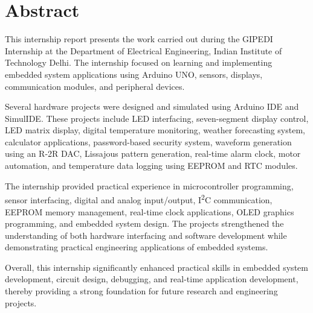 \chapter*{Abstract}

This internship report presents the work carried out during the GIPEDI Internship at the Department of Electrical Engineering, Indian Institute of Technology Delhi. The internship focused on learning and implementing embedded system applications using Arduino UNO, sensors, displays, communication modules, and peripheral devices.

Several hardware projects were designed and simulated using Arduino IDE and SimulIDE. These projects include LED interfacing, seven-segment display control, LED matrix display, digital temperature monitoring, weather forecasting system, calculator applications, password-based security system, waveform generation using an R-2R DAC, Lissajous pattern generation, real-time alarm clock, motor automation, and temperature data logging using EEPROM and RTC modules.

The internship provided practical experience in microcontroller programming, sensor interfacing, digital and analog input/output, I\textsuperscript{2}C communication, EEPROM memory management, real-time clock applications, OLED graphics programming, and embedded system design. The projects strengthened the understanding of both hardware interfacing and software development while demonstrating practical engineering applications of embedded systems.

Overall, this internship significantly enhanced practical skills in embedded system development, circuit design, debugging, and real-time application development, thereby providing a strong foundation for future research and engineering projects.

\clearpage